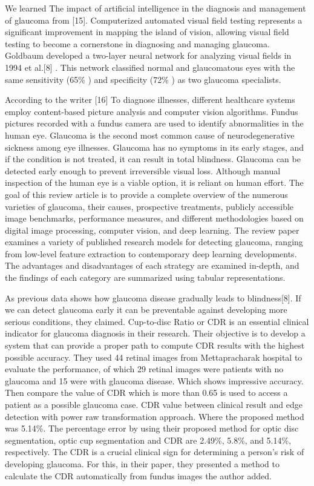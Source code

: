 \vspace{5mm}
\noindent We learned The impact of artificial intelligence in the diagnosis and management of glaucoma from [15]. Computerized automated visual field testing represents a significant improvement in mapping the island of vision, allowing visual field testing to become a cornerstone in diagnosing and managing glaucoma. Goldbaum developed a two-layer neural network for analyzing visual fields in 1994 et al.[8] . This network classified normal and glaucomatous eyes with the same sensitivity (65\% ) and specificity (72\% ) as two glaucoma specialists.

\vspace{5mm}
\noindent According to the writer [16] To diagnose illnesses, different healthcare systems employ content-based picture analysis and computer vision algorithms. Fundus pictures recorded with a fundus camera are used to identify abnormalities in the human eye. Glaucoma is the second most common cause of neurodegenerative sickness among eye illnesses. Glaucoma has no symptoms in its early stages, and if the condition is not treated, it can result in total blindness. Glaucoma can be detected early enough to prevent irreversible visual loss. Although manual inspection of the human eye is a viable option, it is reliant on human effort. The goal of this review article is to provide a complete overview of the numerous varieties of glaucoma, their causes, prospective treatments, publicly accessible image benchmarks, performance measures, and different methodologies based on digital image processing, computer vision, and deep learning. The review paper examines a variety of published research models for detecting glaucoma, ranging from low-level feature extraction to contemporary deep learning developments. The advantages and disadvantages of each strategy are examined in-depth, and the findings of each category are summarized using tabular representations.

\vspace{5mm}
\noindent As previous data shows how glaucoma disease gradually leads to blindness[8]. If we can detect glaucoma early it can be preventable against developing more serious conditions, they claimed. Cup-to-disc Ratio or CDR is an essential clinical indicator for glaucoma diagnosis in their research. Their objective is to develop a system that can provide a proper path to compute CDR results with the highest possible accuracy. They used 44 retinal images from Mettapracharak hospital to evaluate the performance, of which 29 retinal images were patients with no glaucoma and 15 were with glaucoma disease. Which shows impressive accuracy. Then compare the value of CDR which is more than 0.65 is used to access a patient as a possible glaucoma case. CDR value between clinical result and edge detection with power raw transformation approach. Where the proposed method was 5.14\%. The percentage error by using their proposed method for optic disc segmentation, optic cup segmentation and CDR are 2.49\%, 5.8\%, and 5.14\%, respectively. The CDR is a crucial clinical sign for determining a person's risk of developing glaucoma. For this, in their paper, they presented a method to calculate the CDR automatically from fundus images the author added.

